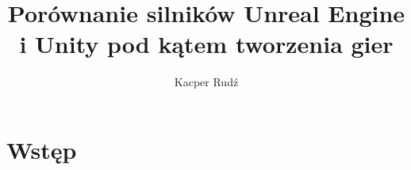 \documentclass[12pt,twoside]{article}
\author{Kacper Rudź}
\title{Porównanie silników Unreal Engine i Unity pod kątem tworzenia gier}
\begin{document}
\maketitle

\blankpage

\tableofcontents

\clearpage
\blankpage




\section{Wstęp}
\end{document}
